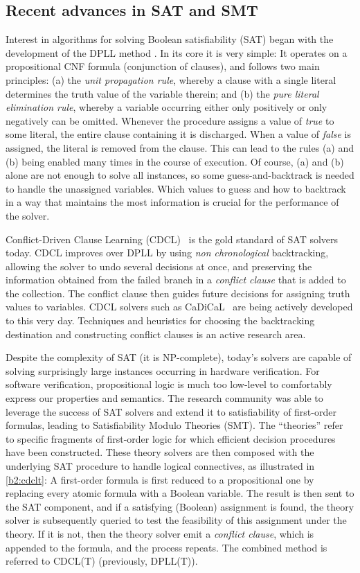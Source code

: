 \subsection{Recent advances in SAT and SMT}

Interest in algorithms for solving Boolean satisfiability (SAT) began with the development of the DPLL method \cite{DPLL1,DPLL2}.
In its core it is very simple:
It operates on a propositional CNF formula (conjunction of clauses), and follows two main principles:
(a) the \emph{unit propagation rule}, whereby a clause with a single literal determines the truth value of the variable therein; and
(b) the \emph{pure literal elimination rule}, whereby a variable occurring either only positively or only negatively can be omitted.
Whenever the procedure assigns a value of \emph{true} to some literal, the entire clause containing it is discharged.
When a value of \emph{false} is assigned, the literal is removed from the clause.
This can lead to the rules (a) and (b) being enabled many times in the course of execution.
Of course, (a) and (b) alone are not enough to solve all instances, so some guess-and-backtrack is needed to handle the unassigned variables.
Which values to guess and how to backtrack in a way that maintains the most information is crucial for the performance of the solver.

Conflict-Driven Clause Learning (CDCL)~\cite{CDCL} is the gold standard of SAT solvers today.
CDCL improves over DPLL by using \emph{non chronological} backtracking, allowing the solver to undo several decisions at once, and preserving the information obtained from the failed branch in a \emph{conflict clause} that is added to the collection.
The conflict clause then guides future decisions for assigning truth values to variables.
CDCL solvers such as CaDiCaL~\cite{SAT2020:CaDiCaL} are being actively developed to this very day.
Techniques and heuristics for choosing the backtracking destination and constructing conflict clauses is an active research area.



Despite the complexity of SAT (it is NP-complete), today's solvers are capable of solving surprisingly large instances occurring in hardware verification.
For software verification, propositional logic is much too low-level to comfortably express our properties and semantics.
The research community was able to leverage the success of SAT solvers and extend it to satisfiability of first-order formulas, leading to Satisfiability Modulo Theories (SMT).
The ``theories'' refer to specific fragments of first-order logic for which efficient decision procedures have been constructed.
These theory solvers are then composed with the underlying SAT procedure to handle logical connectives, as illustrated in \autoref{b2:cdclt}:
A first-order formula is first reduced to a propositional one by replacing every atomic formula with a Boolean variable.
The result is then sent to the SAT component,
and if a satisfying (Boolean) assignment is found,
the theory solver is subsequently queried to test the feasibility of this assignment under the theory.
If it is not, then the theory solver emit a \emph{conflict clause}, which is appended to the formula, and the process repeats.
The combined method is referred to CDCL(T) (previously, DPLL(T)).
